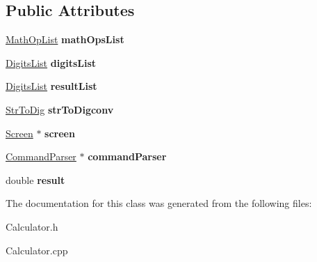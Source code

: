 \subsection*{Public Attributes}
\begin{DoxyCompactItemize}
\item 
\hypertarget{class_calculator_a83ba050dfe21fef546e0aacf8ebb2cfb}{}\hyperlink{class_math_op_list}{Math\+Op\+List} {\bfseries math\+Ops\+List}\label{class_calculator_a83ba050dfe21fef546e0aacf8ebb2cfb}

\item 
\hypertarget{class_calculator_a4cc749b081a72aad5f5f8dbf82f95f68}{}\hyperlink{class_digits_list}{Digits\+List} {\bfseries digits\+List}\label{class_calculator_a4cc749b081a72aad5f5f8dbf82f95f68}

\item 
\hypertarget{class_calculator_a0949ffa164e30bc1993458c0c3324eae}{}\hyperlink{class_digits_list}{Digits\+List} {\bfseries result\+List}\label{class_calculator_a0949ffa164e30bc1993458c0c3324eae}

\item 
\hypertarget{class_calculator_a1b2ba1eef203f0ace18ab250b5c744e8}{}\hyperlink{class_str_to_dig}{Str\+To\+Dig} {\bfseries str\+To\+Digconv}\label{class_calculator_a1b2ba1eef203f0ace18ab250b5c744e8}

\item 
\hypertarget{class_calculator_ae2ab6e8ffe7394e5582bb0f1ed35b8aa}{}\hyperlink{class_screen}{Screen} $\ast$ {\bfseries screen}\label{class_calculator_ae2ab6e8ffe7394e5582bb0f1ed35b8aa}

\item 
\hypertarget{class_calculator_a471648b3d6fdd6773f9b6310bc94b7f1}{}\hyperlink{class_command_parser}{Command\+Parser} $\ast$ {\bfseries command\+Parser}\label{class_calculator_a471648b3d6fdd6773f9b6310bc94b7f1}

\item 
\hypertarget{class_calculator_a674f485bcc900869ed101651bebf5618}{}double {\bfseries result}\label{class_calculator_a674f485bcc900869ed101651bebf5618}

\end{DoxyCompactItemize}


The documentation for this class was generated from the following files\+:\begin{DoxyCompactItemize}
\item 
Calculator.\+h\item 
Calculator.\+cpp\end{DoxyCompactItemize}
